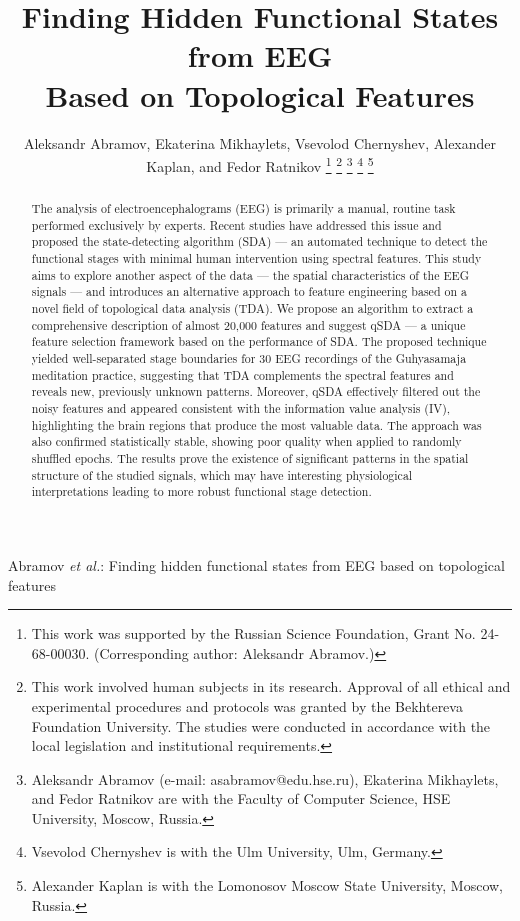 \documentclass[10pt,lettersize,journal]{IEEEtran}
\begin{document}
\title{Finding Hidden Functional States from EEG \\Based on Topological Features}

\author{
  Aleksandr Abramov, Ekaterina Mikhaylets, Vsevolod Chernyshev, Alexander Kaplan, and Fedor Ratnikov
  \thanks{This work was supported by the Russian Science Foundation, Grant No. 24-68-00030. (Corresponding author: Aleksandr Abramov.)}
  \thanks{This work involved human subjects in its research. Approval of all ethical and experimental procedures and protocols was granted by the Bekhtereva Foundation University. The studies were conducted in accordance with the local legislation and institutional requirements.}
  \thanks{Aleksandr Abramov (e-mail: asabramov@edu.hse.ru), Ekaterina Mikhaylets, and Fedor Ratnikov are with the Faculty of Computer Science, HSE University, Moscow, Russia.}
  \thanks{Vsevolod Chernyshev is with the Ulm University, Ulm, Germany.}
  \thanks{Alexander Kaplan is with the Lomonosov Moscow State University, Moscow, Russia.}
}

%
{Abramov \MakeLowercase{\textit{et al.}}: Finding hidden functional states from EEG based on topological features}

\maketitle

\begin{abstract}
The analysis of electroencephalograms (EEG) is primarily a manual, routine task performed exclusively by experts. Recent studies have addressed this issue and proposed the state-detecting algorithm (SDA) --- an automated technique to detect the functional stages with minimal human intervention using spectral features. This study aims to explore another aspect of the data --- the spatial characteristics of the EEG signals --- and introduces an alternative approach to feature engineering based on a novel field of topological data analysis (TDA). We propose an algorithm to extract a comprehensive description of almost 20,000 features and suggest qSDA --- a unique feature selection framework based on the performance of SDA. The proposed technique yielded well-separated stage boundaries for 30 EEG recordings of the Guhyasamaja meditation practice, suggesting that TDA complements the spectral features and reveals new, previously unknown patterns. Moreover, qSDA effectively filtered out the noisy features and appeared consistent with the information value analysis (IV), highlighting the brain regions that produce the most valuable data. The approach was also confirmed statistically stable, showing poor quality when applied to randomly shuffled epochs. The results prove the existence of significant patterns in the spatial structure of the studied signals, which may have interesting physiological interpretations leading to more robust functional stage detection.
\end{abstract}
\end{document}
